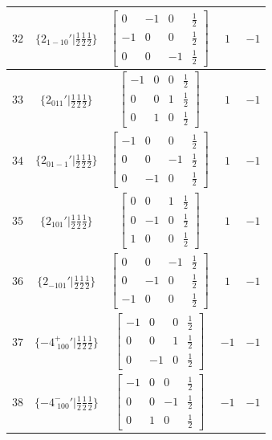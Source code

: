 \documentclass[fleqn,8pt]{jsarticle}
\begin{document}
\begin{longtable}{ccccc}
$ 32 $ & $ \{2{}_{1-10}{}'|\frac{1}{2} \frac{1}{2} \frac{1}{2}\} $ & $ \begin{bmatrix} 0 & -1 & 0 & \frac{1}{2} \\ -1 & 0 & 0 & \frac{1}{2} \\ 0 & 0 & -1 & \frac{1}{2} \end{bmatrix} $ & $ 1 $ & $ -1 $ \\ \hline
$ 33 $ & $ \{2{}_{011}{}'|\frac{1}{2} \frac{1}{2} \frac{1}{2}\} $ & $ \begin{bmatrix} -1 & 0 & 0 & \frac{1}{2} \\ 0 & 0 & 1 & \frac{1}{2} \\ 0 & 1 & 0 & \frac{1}{2} \end{bmatrix} $ & $ 1 $ & $ -1 $ \\ \hline
$ 34 $ & $ \{2{}_{01-1}{}'|\frac{1}{2} \frac{1}{2} \frac{1}{2}\} $ & $ \begin{bmatrix} -1 & 0 & 0 & \frac{1}{2} \\ 0 & 0 & -1 & \frac{1}{2} \\ 0 & -1 & 0 & \frac{1}{2} \end{bmatrix} $ & $ 1 $ & $ -1 $ \\ \hline
$ 35 $ & $ \{2{}_{101}{}'|\frac{1}{2} \frac{1}{2} \frac{1}{2}\} $ & $ \begin{bmatrix} 0 & 0 & 1 & \frac{1}{2} \\ 0 & -1 & 0 & \frac{1}{2} \\ 1 & 0 & 0 & \frac{1}{2} \end{bmatrix} $ & $ 1 $ & $ -1 $ \\ \hline
$ 36 $ & $ \{2{}_{-101}{}'|\frac{1}{2} \frac{1}{2} \frac{1}{2}\} $ & $ \begin{bmatrix} 0 & 0 & -1 & \frac{1}{2} \\ 0 & -1 & 0 & \frac{1}{2} \\ -1 & 0 & 0 & \frac{1}{2} \end{bmatrix} $ & $ 1 $ & $ -1 $ \\ \hline
$ 37 $ & $ \{-4^{+}_{\,\,100}{}'|\frac{1}{2} \frac{1}{2} \frac{1}{2}\} $ & $ \begin{bmatrix} -1 & 0 & 0 & \frac{1}{2} \\ 0 & 0 & 1 & \frac{1}{2} \\ 0 & -1 & 0 & \frac{1}{2} \end{bmatrix} $ & $ -1 $ & $ -1 $ \\ \hline
$ 38 $ & $ \{-4^{-}_{\,\,100}{}'|\frac{1}{2} \frac{1}{2} \frac{1}{2}\} $ & $ \begin{bmatrix} -1 & 0 & 0 & \frac{1}{2} \\ 0 & 0 & -1 & \frac{1}{2} \\ 0 & 1 & 0 & \frac{1}{2} \end{bmatrix} $ & $ -1 $ & $ -1 $ \\ \hline

\end{longtable}
\end{document}
